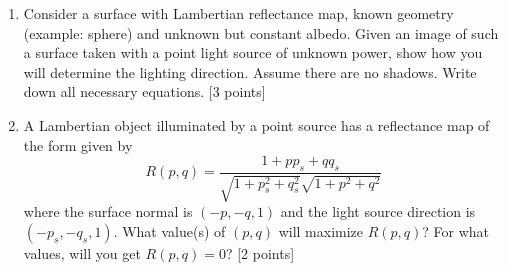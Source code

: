 \documentclass[11pt]{article}
\begin{document}
\begin{enumerate}
\item Consider a surface with Lambertian reflectance map, known geometry (example: sphere) and unknown but constant albedo. Given an image of such a surface taken with a point light source of unknown power, show how you will determine the lighting direction. Assume there are no shadows. Write down all necessary equations. \textsf{[3 points]}

\item A Lambertian object illuminated by a point source has a reflectance map of the form given by 
\begin{equation}
R(p,q) = \frac{1+pp_s + qq_s}{\sqrt{1+p^2_s+q^2_s}\sqrt{1+p^2+q^2}}
\end{equation}
where the surface normal is $(-p,-q,1)$ and the light source direction is $(-p_s,-q_s,1)$. What value(s) of $(p,q)$ will maximize $R(p,q)$? For what values, will you get $R(p,q) = 0$? \textsf{[2 points]}


\end{enumerate}
\end{document}
